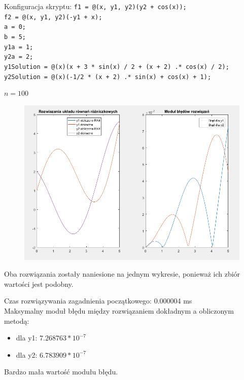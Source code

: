\documentclass[12pt]{article}
\begin{document}
\begin{enumerate}[label=\textbf{Przykład \arabic*}]
		Konfiguracja skryptu:
		\texttt{f1 = @(x, y1, y2)(y2 + cos(x)); \\
			f2 = @(x, y1, y2)(-y1 + x); \\
			a = 0; \\
			b = 5; \\
			y1a = 1; \\
			y2a = 2; \\
			y1Solution = @(x)(x + 3 * sin(x) / 2 + (x + 2) .* cos(x) / 2); \\ 
			y2Solution = @(x)(-1/2 * (x + 2) .* sin(x) + cos(x) + 1);
		}
	
		$n = 100$
		
		\begin{figure}[H]
			\centering
			\includegraphics[scale=0.7]{images/example-4.png}
		\end{figure}
		Oba rozwiązania zostały naniesione na jednym wykresie, ponieważ ich zbiór wartości jest podobny.
		
		
		Czas rozwiązywania zagadnienia początkowego: 0.000004 ms\\
		Maksymalny moduł błędu między rozwiązaniem dokładnym a obliczonym metodą:
		\begin{itemize}
			\item dla y1: $7.268763 * 10^{-7}$
			\item dla y2: $6.783909 * 10^{-7}$
		\end{itemize}
	
		Bardzo mała wartość modułu błędu.
		
	\end{enumerate}
	
	
	
\end{document}
